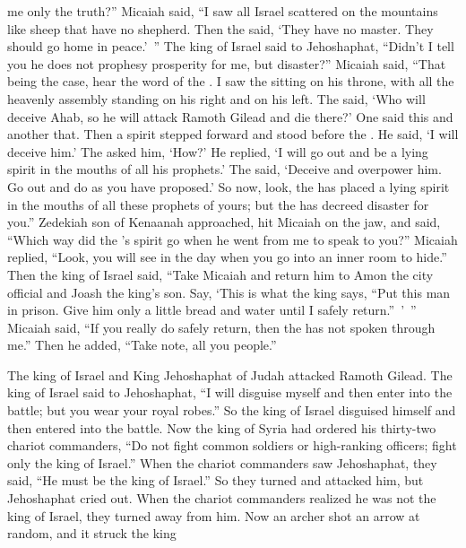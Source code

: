 {me
only
the truth?”
Micaiah said,
“I saw
all
Israel
scattered
on
the mountains
like sheep
that
have no
shepherd.
Then the
{}
said,
‘They have no
master.
They
should go
home
in peace.’ ”
The king
of Israel
said
to
Jehoshaphat,
“Didn’t
I tell
you he does not
prophesy
prosperity
for
me, but
disaster?”
Micaiah said,
“That being
the case, hear
the word
of the {}. I saw
the {}
sitting
on
his throne,
with all
the heavenly
assembly
standing
on
his right
and on his left.
The
{}
said,
‘Who
will deceive
Ahab,
so
he will attack
Ramoth
Gilead
and die
there?’ One
said
this and another that.
Then
a spirit
stepped
forward and stood
before
the {}. He said,
‘I
will deceive him.’ The
{} asked him, ‘How?’
He
replied,
‘I will go out
and be
a lying
spirit
in the mouths
of all
his prophets.’
The
{} said,
‘Deceive
and overpower him. Go out
and do
as you have proposed.’
So now,
look,
the {}
has placed
a lying
spirit
in the mouths
of all
these
prophets
of yours;
but the
{}
has decreed
disaster for you.”
Zedekiah
son
of Kenaanah
approached,
hit
Micaiah
on
the jaw,
and said,
“Which
way did the
{}’s
spirit
go when
he went from me to speak
to you?”
Micaiah
replied,
“Look,
you will see
in the day
when
you go
into an inner room
to hide.”
Then the king
of Israel
said,
“Take
Micaiah
and return
him to
Amon
the city
official
and Joash
the king’s
son.
Say,
‘This is what
the king
says,
“Put
this
man in prison.
Give
him only a little
bread
and water
until
I safely
return.” ’ ”
Micaiah
said,
“If
you really
do safely
return,
then the
{}
has not
spoken
through me.” Then he added, “Take note,
all
you people.”
\par }{\PP {}The king
of Israel
and King
Jehoshaphat
of Judah
attacked Ramoth
Gilead.
The king
of Israel
said
to
Jehoshaphat,
“I will disguise
myself and then enter
into the battle;
but you
wear
your royal robes.”
So the king
of Israel
disguised
himself and then entered
into the battle.
Now the king
of Syria
had ordered
his thirty-two
chariot
commanders,
“Do not
fight
common
soldiers or high-ranking
officers; fight only
the king
of Israel.”
When
the chariot
commanders
saw
Jehoshaphat,
they
said,
“He must
be the king
of Israel.”
So they turned
and attacked
him, but Jehoshaphat
cried out.
When
the chariot
commanders
realized
he was
not
the king
of Israel,
they turned
away
from him.
Now an archer
shot
an arrow
at random,
and it struck
the king
}
